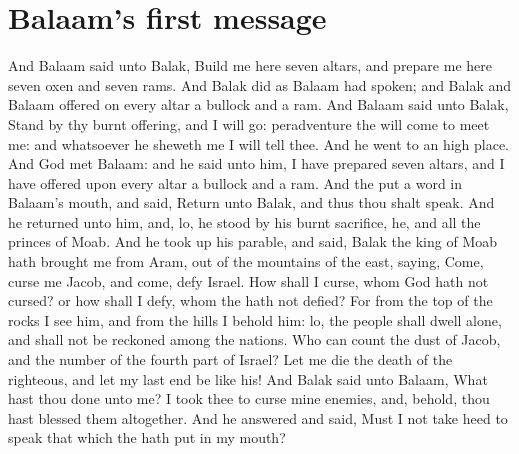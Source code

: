 \section*{Balaam's first message}
\begin{biblechapter} %
\verse And Balaam said unto Balak, Build me here seven altars, and prepare me here seven oxen and seven rams.
\verse And Balak did as Balaam had spoken; and Balak and Balaam offered on every altar a bullock and a ram.
\verse And Balaam said unto Balak, Stand by thy burnt offering, and I will go: peradventure the \LORD will come to meet me: and whatsoever he sheweth me I will tell thee. And he went to an high place.
\verse And God met Balaam: and he said unto him, I have prepared seven altars, and I have offered upon every altar a bullock and a ram.
\verse And the \LORD put a word in Balaam's mouth, and said, Return unto Balak, and thus thou shalt speak.
\verse And he returned unto him, and, lo, he stood by his burnt sacrifice, he, and all the princes of Moab.
\verse And he took up his parable, and said, Balak the king of Moab hath brought me from Aram, out of the mountains of the east, saying, Come, curse me Jacob, and come, defy Israel.
\verse How shall I curse, whom God hath not cursed? or how shall I defy, whom the \LORD hath not defied?
\verse For from the top of the rocks I see him, and from the hills I behold him: lo, the people shall dwell alone, and shall not be reckoned among the nations.
\verse Who can count the dust of Jacob, and the number of the fourth part of Israel? Let me die the death of the righteous, and let my last end be like his!
\verse And Balak said unto Balaam, What hast thou done unto me? I took thee to curse mine enemies, and, behold, thou hast blessed them altogether.
\verse And he answered and said, Must I not take heed to speak that which the \LORD hath put in my mouth?

\end{biblechapter}
